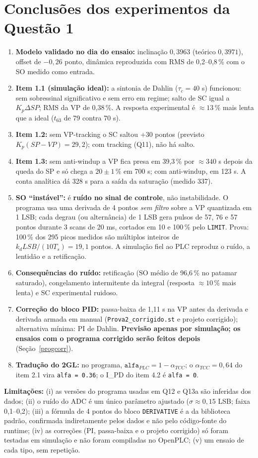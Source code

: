 \section{Conclusões dos experimentos da Questão 1}\label{conclq1}
\begin{enumerate}
\item \textbf{Modelo validado no dia do ensaio:} inclinação $0{,}3963$ (teórico $0{,}3971$), offset de $-0{,}26$ ponto, dinâmica reproduzida com RMS de 0,2--0,8\,\% com o SO medido como entrada.
\item \textbf{Item 1.1 (simulação ideal):} a sintonia de Dahlin ($\tau_c=40$ s) funcionou: sem sobressinal significativo e sem erro em regime; salto de SC igual a $K_p\Delta SP$; RMS da VP de 0,38\,\%. A resposta experimental é $\approx13\,\%$ mais lenta que a ideal ($t_{63}$ de 79 contra 70 s).
\item \textbf{Item 1.2:} sem VP-tracking o SC saltou $+30$ pontos (previsto $K_p(SP-VP)=29{,}2$); com tracking (Q11), não há salto.
\item \textbf{Item 1.3:} sem anti-windup a VP fica presa em 39,3\,\% por $\approx340$ s depois da queda do SP e só chega a $20\pm1\,\%$ em 700 s; com anti-windup, em 123 s. A conta analítica dá 328 s para a saída da saturação (medido 337).
\item \textbf{SO ``instável'':} é \textbf{ruído no sinal de controle}, não instabilidade. O programa usa uma derivada de 4 pontos \emph{sem filtro} sobre a VP quantizada em 1 LSB; cada degrau (ou alternância) de 1 LSB gera pulsos de 57, 76 e 57 pontos durante 3 scans de 20 ms, cortados em 10 e 100\,\% pelo \texttt{LIMIT}. Prova: 100\,\% dos 295 picos medidos são múltiplos inteiros de $k_dLSB/(10T_s)=19{,}1$ pontos. A simulação fiel ao PLC reproduz o ruído, a lentidão e a retificação.
\item \textbf{Consequências do ruído:} retificação (SO médio de 96,6\,\% no patamar saturado), congelamento intermitente da integral (resposta $\approx10\,\%$ mais lenta) e SC experimental ruidoso.
\item \textbf{Correção do bloco PID:} passa-baixa de 1,11 s na VP antes da derivada e derivada armada em manual (\texttt{Prova2\_corrigido.st} e projeto corrigido); alternativa mínima: PI de Dahlin. \textbf{Previsão apenas por simulação; os ensaios com o programa corrigido serão feitos depois} (Seção~\ref{progcorr}).
\item \textbf{Tradução do 2GL:} no programa, $\mathtt{alfa}_{PLC}=1-\alpha_{TCC}$; o $\alpha_{TCC}=0{,}64$ do item 2.1 vira \texttt{alfa = 0.36}; o I\_PD do item 4.2 é \texttt{alfa = 0}.
\end{enumerate}
\textbf{Limitações:} (i) as versões do programa usadas em Q12 e Q13a são inferidas dos dados; (ii) o ruído do ADC é um único parâmetro ajustado ($\sigma\approx0{,}15$ LSB; faixa 0,1--0,2); (iii) a fórmula de 4 pontos do bloco \texttt{DERIVATIVE} é a da biblioteca padrão, confirmada indiretamente pelos dados e não pelo código-fonte do runtime; (iv) as correções (PI, passa-baixa e o projeto corrigido) só foram testadas em simulação e não foram compiladas no OpenPLC; (v) um ensaio de cada tipo, sem repetição.

